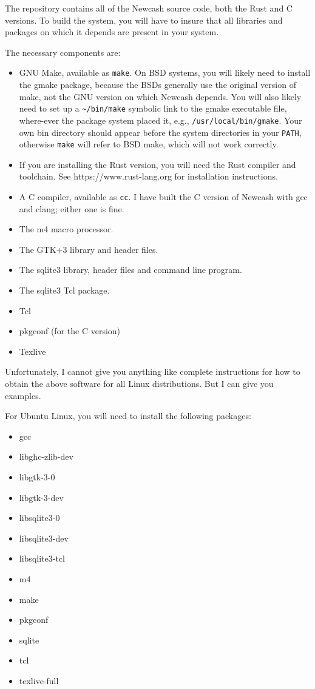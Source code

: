 \documentclass{report}
\begin{document}
The repository contains all of the Newcash source code, both the Rust and C versions. To build the system, you will have to insure that all libraries and packages on which it depends are present in your system. 

The necessary components are:
\begin{itemize}
\item GNU Make, available as \verb|make|. On BSD systems, you will likely need to install the gmake package, because the BSDs generally use the original version of make, not the GNU version on which Newcash depends.
You will also likely need to set up a \verb|~/bin/make| symbolic link to the gmake executable file, where-ever the package system placed it, e.g., \verb|/usr/local/bin/gmake|.
Your own bin directory should appear before the system directories in your \verb|PATH|, 
otherwise \verb|make| will refer to BSD make, which will not work correctly.
\item If you are installing the Rust version, you will need the Rust compiler and toolchain. See https://www.rust-lang.org for installation instructions. 
\item A C compiler, available as \verb|cc|. I have built the C version of Newcash with gcc and clang; either one is fine.
\item The m4 macro processor.
\item The GTK+3 library and header files.
\item The sqlite3 library, header files and command line program.
\item The sqlite3 Tcl package.
\item Tcl
\item pkgconf (for the C version)
\item Texlive
\end{itemize}

Unfortunately, I cannot give you anything like complete instructions for how to obtain the above software for all Linux distributions. But I can give you examples. 

For Ubuntu Linux, you will need to install the following packages:
\begin{itemize}
\item gcc
\item libghc-zlib-dev
\item libgtk-3-0
\item libgtk-3-dev
\item libsqlite3-0
\item libsqlite3-dev
\item libsqlite3-tcl
\item m4
\item make
\item pkgconf
\item sqlite
\item tcl
\item texlive-full
\end{itemize}
\end{document}
